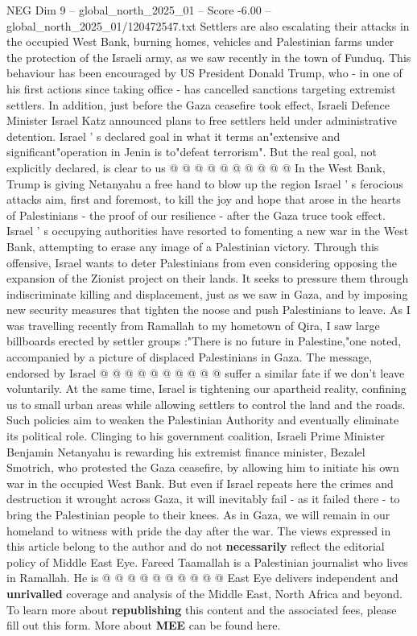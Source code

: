 \begin{textsample}{NEG Dim 9 – global\_north\_2025\_01 – Score -6.00 – global\_north\_2025\_01/120472547.txt}
Settlers are also escalating their attacks in the occupied West Bank, burning homes, vehicles and Palestinian farms under the protection of the Israeli army, as we saw recently in the town of Funduq.
This behaviour has been encouraged by US President Donald Trump, who - in one of his first actions since taking office - has cancelled sanctions targeting extremist settlers.
In addition, just before the Gaza ceasefire took effect, Israeli Defence Minister Israel Katz announced plans to free settlers held under administrative detention.
Israel ' s declared goal in what it terms an"extensive and significant"operation in Jenin is to"defeat terrorism".
But the real goal, not explicitly declared, is clear to us @ @ @ @ @ @ @ @ @ @ In the West Bank, Trump is giving Netanyahu a free hand to blow up the region Israel ' s ferocious attacks aim, first and foremost, to kill the joy and hope that arose in the hearts of Palestinians - the proof of our resilience - after the Gaza truce took effect.
Israel ' s occupying authorities have resorted to fomenting a new war in the West Bank, attempting to erase any image of a Palestinian victory.
Through this offensive, Israel wants to deter Palestinians from even considering opposing the expansion of the Zionist project on their lands.
It seeks to pressure them through indiscriminate killing and displacement, just as we saw in Gaza, and by imposing new security measures that tighten the noose and push Palestinians to leave.
As I was travelling recently from Ramallah to my hometown of Qira, I saw large billboards erected by settler groups :"There is no future in Palestine,"one noted, accompanied by a picture of displaced Palestinians in Gaza.
The message, endorsed by Israel @ @ @ @ @ @ @ @ @ @ suffer a similar fate if we don't leave voluntarily.
At the same time, Israel is tightening our apartheid reality, confining us to small urban areas while allowing settlers to control the land and the roads.
Such policies aim to weaken the Palestinian Authority and eventually eliminate its political role.
Clinging to his government coalition, Israeli Prime Minister Benjamin Netanyahu is rewarding his extremist finance minister, Bezalel Smotrich, who protested the Gaza ceasefire, by allowing him to initiate his own war in the occupied West Bank.
But even if Israel repeats here the crimes and destruction it wrought across Gaza, it will inevitably fail - as it failed there - to bring the Palestinian people to their knees.
As in Gaza, we will remain in our homeland to witness with pride the day after the war.
The views expressed in this article belong to the author and do not \textbf{necessarily} reflect the editorial policy of Middle East Eye.
Fareed Taamallah is a Palestinian journalist who lives in Ramallah.
He is @ @ @ @ @ @ @ @ @ @ East Eye delivers independent and \textbf{unrivalled} coverage and analysis of the Middle East, North Africa and beyond.
To learn more about \textbf{republishing} this content and the associated fees, please fill out this form.
More about \textbf{MEE} can be found here.

\end{textsample}

